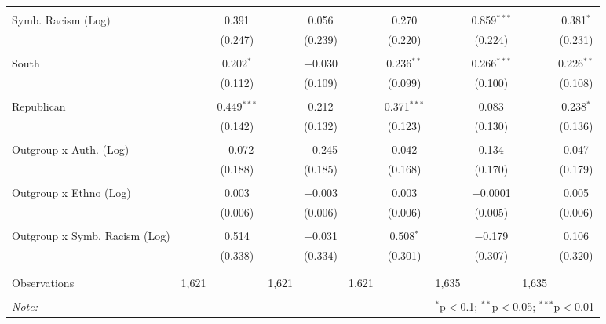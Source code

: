 \begin{table}[!htbp]
{\begin{tabular}{@{\extracolsep{5pt}}lcccccccccc}
  & & & & & & & & & & \\ 
 Symb. Racism (Log) &  & 0.391 &  & 0.056 &  & 0.270 &  & 0.859$^{***}$ &  & 0.381$^{*}$ \\ 
  &  & (0.247) &  & (0.239) &  & (0.220) &  & (0.224) &  & (0.231) \\ 
  & & & & & & & & & & \\ 
 South &  & 0.202$^{*}$ &  & $-$0.030 &  & 0.236$^{**}$ &  & 0.266$^{***}$ &  & 0.226$^{**}$ \\ 
  &  & (0.112) &  & (0.109) &  & (0.099) &  & (0.100) &  & (0.108) \\ 
  & & & & & & & & & & \\ 
 Republican &  & 0.449$^{***}$ &  & 0.212 &  & 0.371$^{***}$ &  & 0.083 &  & 0.238$^{*}$ \\ 
  &  & (0.142) &  & (0.132) &  & (0.123) &  & (0.130) &  & (0.136) \\ 
  & & & & & & & & & & \\ 
 Outgroup x Auth. (Log) &  & $-$0.072 &  & $-$0.245 &  & 0.042 &  & 0.134 &  & 0.047 \\ 
  &  & (0.188) &  & (0.185) &  & (0.168) &  & (0.170) &  & (0.179) \\ 
  & & & & & & & & & & \\ 
 Outgroup x Ethno (Log) &  & 0.003 &  & $-$0.003 &  & 0.003 &  & $-$0.0001 &  & 0.005 \\ 
  &  & (0.006) &  & (0.006) &  & (0.006) &  & (0.005) &  & (0.006) \\ 
  & & & & & & & & & & \\ 
 Outgroup x Symb. Racism (Log) &  & 0.514 &  & $-$0.031 &  & 0.508$^{*}$ &  & $-$0.179 &  & 0.106 \\ 
  &  & (0.338) &  & (0.334) &  & (0.301) &  & (0.307) &  & (0.320) \\ 
  & & & & & & & & & & \\ 
\hline \\[-1.8ex] 
Observations & 1,621 &  & 1,621 &  & 1,621 &  & 1,635 &  & 1,635 &  \\ 
\hline 
\hline \\[-1.8ex] 
\textit{Note:}  & \multicolumn{10}{r}{$^{*}$p$<$0.1; $^{**}$p$<$0.05; $^{***}$p$<$0.01} \\ 
\end{tabular}} 
\end{table} 
